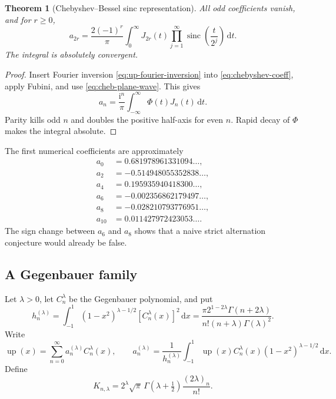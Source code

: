 \documentclass[11pt,oneside]{article}
\newtheorem{theorem}{Theorem}[section]
\theoremstyle{definition}
\theoremstyle{remark}
\newcommand{\Up}{\operatorname{up}}
\newcommand{\sinc}{\operatorname{sinc}}
\newcommand{\dd}{\,\mathrm d}
\newcommand{\ii}{\mathrm i}
\newcommand{\1}{\mathbf 1}
\begin{document}
\begin{theorem}[Chebyshev--Bessel sinc representation]
\label{thm:cheb-bessel}
All odd coefficients vanish, and for $r\ge0$,
\begin{equation}
 \boxed{\displaystyle
 a_{2r}=\frac{2(-1)^r}{\pi}
 \int_0^\infty J_{2r}(t)
 \prod_{j=1}^\infty\sinc\!\left(\frac{t}{2^j}\right)\dd t.} \label{eq:cheb-bessel}
\end{equation}
The integral is absolutely convergent.
\end{theorem}

\begin{proof}
Insert Fourier inversion \eqref{eq:up-fourier-inversion} into
\eqref{eq:chebyshev-coeff}, apply Fubini, and use
\eqref{eq:cheb-plane-wave}.  This gives
\[
 a_n=\frac{\ii^n}{\pi}\int_{-\infty}^{\infty}\Phi(t)J_n(t)\dd t.
\]
Parity kills odd $n$ and doubles the positive half-axis for even $n$.
Rapid decay of $\Phi$ makes the integral absolute.
\end{proof}

The first numerical coefficients are approximately
\begin{equation}
 \begin{split}
 a_0&= 0.681978961331094\ldots,\\
 a_2&=-0.514948055352838\ldots,\\
 a_4&= 0.195935940418300\ldots,\\
 a_6&=-0.002356862179497\ldots,\\
 a_8&=-0.028210793776951\ldots,\\
 a_{10}&=0.011427972423053\ldots.
 \end{split}                                             \label{eq:cheb-first}
\end{equation}
The sign change between $a_6$ and $a_8$ shows that a naive strict alternation
conjecture would already be false.

\subsection{A Gegenbauer family}

Let $\lambda>0$, let $C_n^\lambda$ be the Gegenbauer polynomial, and put
\begin{equation}
 h_n^{(\lambda)}=
 \int_{-1}^{1}(1-x^2)^{\lambda-1/2}
 [C_n^\lambda(x)]^2\dd x
 =\frac{\pi2^{1-2\lambda}\Gamma(n+2\lambda)}
 {n!(n+\lambda)\Gamma(\lambda)^2}.                       \label{eq:gegenbauer-norm}
\end{equation}
Write
\begin{equation}
 \Up(x)=\sum_{n=0}^\infty a_n^{(\lambda)}C_n^\lambda(x),
 \qquad
 a_n^{(\lambda)}=\frac1{h_n^{(\lambda)}}
 \int_{-1}^{1}\Up(x)C_n^\lambda(x)
 (1-x^2)^{\lambda-1/2}\dd x.                            \label{eq:gegenbauer-series}
\end{equation}
Define
\begin{equation}
 K_{n,\lambda}=2^\lambda\sqrt\pi\,
 \Gamma(\lambda+\tfrac12)\frac{(2\lambda)_n}{n!}.      \label{eq:gegenbauer-K}
\end{equation}
\end{document}

